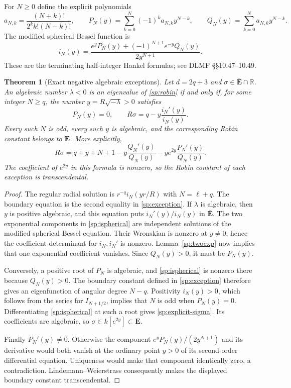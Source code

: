 \documentclass[11pt]{article}
\newtheorem{theorem}{Theorem}[section]
\theoremstyle{definition}
\theoremstyle{remark}
\begin{document}
For $N\ge0$ define the explicit polynomials
\begin{equation}\label{sp:polynomials}
 a_{N,k}=\frac{(N+k)!}{2^k k!(N-k)!},\qquad
 P_N(y)=\sum_{k=0}^N(-1)^k a_{N,k}y^{N-k},\qquad
 Q_N(y)=\sum_{k=0}^N a_{N,k}y^{N-k}.
\end{equation}
The modified spherical Bessel function is
\begin{equation}\label{sp:ispherical}
 i_N(y)=\frac{e^yP_N(y)+(-1)^{N+1}e^{-y}Q_N(y)}{2y^{N+1}}.
\end{equation}
These are the terminating half-integer Hankel formulas; see DLMF
\S\S10.47--10.49.

\begin{theorem}[Exact negative algebraic exceptions]\label{sp:negative}
Let $d=2q+3$ and $\sigma\in\overline{\mathbf E}\cap\mathbb R$.
An algebraic number $\lambda<0$ is an eigenvalue of
\eqref{sp:robin} if and only if, for some integer $N\ge q$, the number
$y=R\sqrt{-\lambda}>0$ satisfies
\begin{equation}\label{sp:exception}
 P_N(y)=0,\qquad
 R\sigma=q-y\frac{i_N'(y)}{i_N(y)}.
\end{equation}
Every such $N$ is odd, every such $y$ is algebraic, and the corresponding
Robin constant belongs to $\mathbf E$.  More explicitly,
\begin{equation}\label{sp:explicit-sigma}
 R\sigma=q+y+N+1-y\frac{Q_N'(y)}{Q_N(y)}
                   -y e^{2y}\frac{P_N'(y)}{Q_N(y)}.
\end{equation}
The coefficient of $e^{2y}$ in this formula is nonzero, so the Robin
constant of each exception is transcendental.
\end{theorem}
\begin{proof}
The regular radial solution is $r^{-q}i_N(yr/R)$ with $N=\ell+q$.
The boundary equation is the second equality in \eqref{sp:exception}.
If $\lambda$ is algebraic, then $y$ is positive algebraic, and this
equation puts $i_N'(y)/i_N(y)$ in $\overline{\mathbf E}$.
The two exponential components in \eqref{sp:ispherical} are independent
solutions of the modified spherical Bessel equation.  Their Wronskian
is nonzero at $y\ne0$; hence the coefficient determinant for
$i_N,i_N'$ is nonzero.  Lemma~\ref{sp:twoexp} now implies that one
exponential coefficient vanishes.  Since $Q_N(y)>0$, it must be
$P_N(y)$.

Conversely, a positive root of $P_N$ is algebraic, and
\eqref{sp:ispherical} is nonzero there because $Q_N(y)>0$.
The boundary constant defined in \eqref{sp:exception} therefore gives
an eigenfunction of angular degree $N-q$.  Positivity $i_N(y)>0$,
which follows from the series for $I_{N+1/2}$, implies that $N$ is odd
when $P_N(y)=0$.  Differentiating \eqref{sp:ispherical} at such a root
gives \eqref{sp:explicit-sigma}.  Its coefficients are algebraic, so
$\sigma\in k[e^{2y}]\subset\mathbf E$.

Finally $P_N'(y)\ne0$.  Otherwise the component
$e^yP_N(y)/(2y^{N+1})$ and its derivative would both vanish at the
ordinary point $y>0$ of its second-order differential equation.
Uniqueness would make that component identically zero, a contradiction.
Lindemann--Weierstrass consequently makes the displayed boundary
constant transcendental.
\end{proof}
\end{document}
